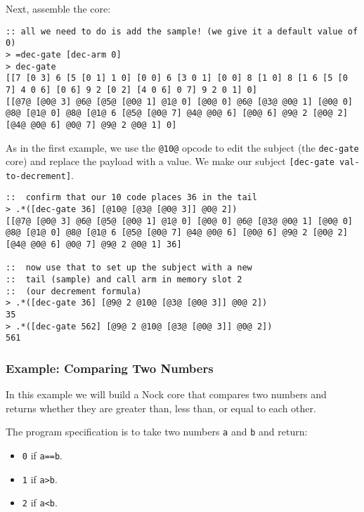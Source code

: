 \documentclass[twoside]{article}
\begin{document}
Next, assemble the core:

\begin{lstlisting}[style=listingblock]
:: all we need to do is add the sample! (we give it a default value of 0)
> =dec-gate [dec-arm 0]
> dec-gate
[[7 [0 3] 6 [5 [0 1] 1 0] [0 0] 6 [3 0 1] [0 0] 8 [1 0] 8 [1 6 [5 [0 7] 4 0 6] [0 6] 9 2 [0 2] [4 0 6] 0 7] 9 2 0 1] 0]
[[@7@ [@0@ 3] @6@ [@5@ [@0@ 1] @1@ 0] [@0@ 0] @6@ [@3@ @0@ 1] [@0@ 0] @8@ [@1@ 0] @8@ [@1@ 6 [@5@ [@0@ 7] @4@ @0@ 6] [@0@ 6] @9@ 2 [@0@ 2] [@4@ @0@ 6] @0@ 7] @9@ 2 @0@ 1] 0]
\end{lstlisting}

As in the first example, we use the \lstinline[style=inlinecode]{@10@} opcode to edit the subject (the \lstinline[style=inlinecode]{dec-gate} core) and replace the payload with a value.  We make our subject \lstinline[style=inlinecode]{[dec-gate val-to-decrement]}.

\begin{lstlisting}[style=listingblock]
::  confirm that our 10 code places 36 in the tail
> .*([dec-gate 36] [@10@ [@3@ [@0@ 3]] @0@ 2])
[[@7@ [@0@ 3] @6@ [@5@ [@0@ 1] @1@ 0] [@0@ 0] @6@ [@3@ @0@ 1] [@0@ 0] @8@ [@1@ 0] @8@ [@1@ 6 [@5@ [@0@ 7] @4@ @0@ 6] [@0@ 6] @9@ 2 [@0@ 2] [@4@ @0@ 6] @0@ 7] @9@ 2 @0@ 1] 36]

::  now use that to set up the subject with a new
::  tail (sample) and call arm in memory slot 2
::  (our decrement formula)
> .*([dec-gate 36] [@9@ 2 @10@ [@3@ [@0@ 3]] @0@ 2])
35
> .*([dec-gate 562] [@9@ 2 @10@ [@3@ [@0@ 3]] @0@ 2])
561
\end{lstlisting}

\subsubsection{Example:  Comparing Two Numbers}

In this example we will build a Nock core that compares two numbers and returns whether they are greater than, less than, or equal to each other.

The program specification is to take two numbers \lstinline[style=inlinecode]{a} and \lstinline[style=inlinecode]{b} and return:

\begin{itemize}
  \item  \lstinline[style=inlinecode]{0} if \lstinline[style=inlinecode]{a==b}.
  \item  \lstinline[style=inlinecode]{1} if \lstinline[style=inlinecode]{a>b}.
  \item  \lstinline[style=inlinecode]{2} if \lstinline[style=inlinecode]{a<b}.
\end{itemize}
\end{document}
